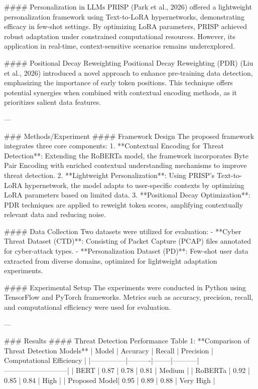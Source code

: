 #### Personalization in LLMs  
PRISP (Park et al., 2026) offered a lightweight personalization framework using Text-to-LoRA hypernetworks, demonstrating efficacy in few-shot settings. By optimizing LoRA parameters, PRISP achieved robust adaptation under constrained computational resources. However, its application in real-time, context-sensitive scenarios remains underexplored.

#### Positional Decay Reweighting  
Positional Decay Reweighting (PDR) (Liu et al., 2026) introduced a novel approach to enhance pre-training data detection, emphasizing the importance of early token positions. This technique offers potential synergies when combined with contextual encoding methods, as it prioritizes salient data features.

---

### Methods/Experiment  
#### Framework Design  
The proposed framework integrates three core components:  
1. **Contextual Encoding for Threat Detection**: Extending the RoBERTa model, the framework incorporates Byte Pair Encoding with enriched contextual understanding mechanisms to improve threat detection.  
2. **Lightweight Personalization**: Using PRISP's Text-to-LoRA hypernetwork, the model adapts to user-specific contexts by optimizing LoRA parameters based on limited data.  
3. **Positional Decay Optimization**: PDR techniques are applied to reweight token scores, amplifying contextually relevant data and reducing noise.

#### Data Collection  
Two datasets were utilized for evaluation:  
- **Cyber Threat Dataset (CTD)**: Consisting of Packet Capture (PCAP) files annotated for cyber-attack types.  
- **Personalization Dataset (PD)**: Few-shot user data extracted from diverse domains, optimized for lightweight adaptation experiments.

#### Experimental Setup  
The experiments were conducted in Python using TensorFlow and PyTorch frameworks. Metrics such as accuracy, precision, recall, and computational efficiency were used for evaluation.

---

### Results  
#### Threat Detection Performance  
Table 1: **Comparison of Threat Detection Models**  
| Model         | Accuracy | Recall | Precision | Computational Efficiency |  
|---------------|----------|--------|-----------|---------------------------|  
| BERT          | 0.87     | 0.78   | 0.81      | Medium                    |  
| RoBERTa       | 0.92     | 0.85   | 0.84      | High                      |  
| Proposed Model| 0.95     | 0.89   | 0.88      | Very High                 |  

